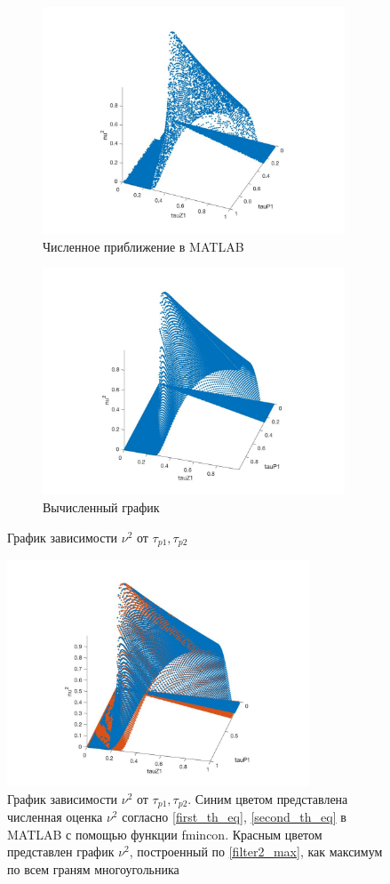\documentclass[a4paper,14pt]{article} %
\theoremstyle{cited}
\begin{document}
  \begin{figure}[H]
\begin{subfigure}{.5\textwidth}
  \includegraphics[width=9cm]{images/filter2_tau0_1e.jpg}
  \caption{Численное приближение в MATLAB}
  \label{filter2:sub1}
\end{subfigure}%
 \begin{subfigure}{.5\textwidth}
  \includegraphics[width=9cm]{images/filter2_tau0_1.jpg}
  \caption{Вычисленный график}
  \label{filter2:sub2}
\end{subfigure}%
\caption{График зависимости $\nu^2$ от $\tau_{p1}, \tau_{p2}$}
\label{filter2:filter2_fig}
\end{figure}

\begin{figure}[H]
\includegraphics[width=9cm]{images/main.jpg}
\caption{График зависимости $\nu^2$ от $\tau_{p1}, \tau_{p2}$. Синим цветом представлена численная оценка $\nu^2$ согласно \eqref{first_th_eq}, \eqref{second_th_eq} в MATLAB с помощью функции fmincon. Красным цветом представлен график $\nu^2$, построенный по \eqref{filter2_max}, как максимум по всем граням многоугольника}
\end{figure}
\end{document}
